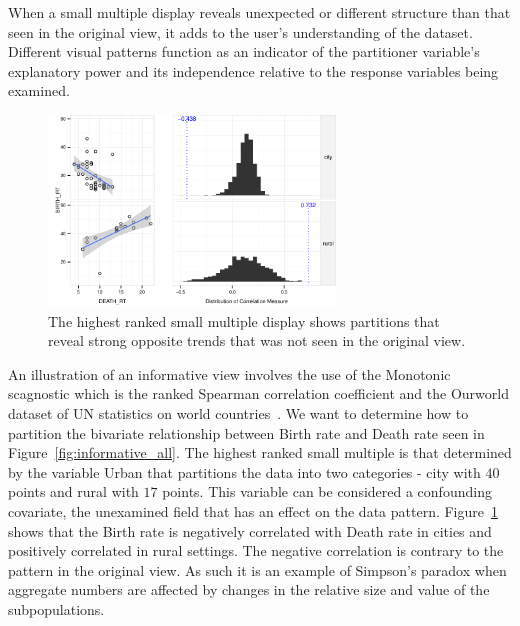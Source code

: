 When a small multiple display reveals unexpected or different structure than that seen in the original view, it adds to the user's understanding of the dataset. Different visual patterns function as an indicator of the partitioner variable's explanatory power and its independence relative to the response variables being examined.

\begin{figure}
\centering
\includegraphics[width=3in,height=2in]{images/6_84034106410344-URBAN.pdf}
  \caption{The highest ranked small multiple display shows partitions that reveal strong opposite trends that was not seen in the original view.}
 \label{fig:informative_sm}
\end{figure}
An illustration of an informative view involves the use of the Monotonic scagnostic  which is the ranked Spearman correlation coefficient and the Ourworld dataset of UN statistics on world countries~\cite{Wilkinson2005GG,Wilkinson2008}. We want to determine how to partition the bivariate relationship between Birth rate and Death rate seen in Figure~\ref{fig:informative_all}. The highest ranked small multiple is that determined by the variable Urban that partitions the data into two categories - city with $40$ points and rural with $17$ points. This variable can be considered a confounding covariate, the unexamined field that has an effect on the data pattern. Figure~\ref{fig:informative_sm} shows that the Birth rate is negatively correlated with Death rate in cities and positively correlated in rural settings. The negative correlation is contrary to the pattern in the original view. As such it is an example of Simpson's paradox when aggregate numbers are affected by changes in the relative size and value of the subpopulations. 
 
